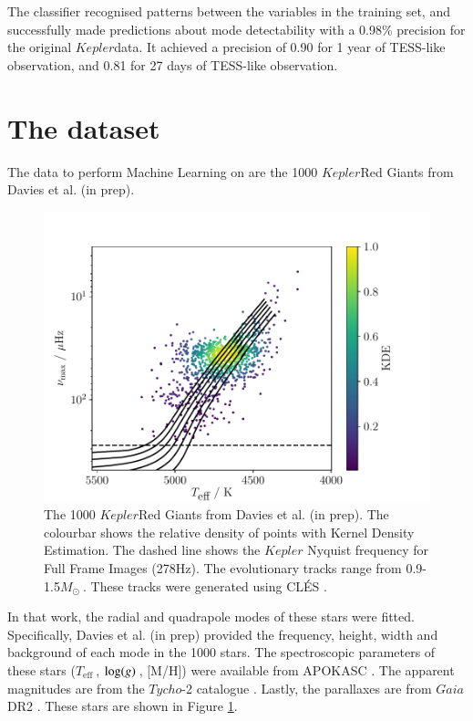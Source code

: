 \documentclass[a4paper,fleqn,usenatbib,useAMS]{mnras}
\newcommand{\teff}{\ensuremath{T_{\textrm{eff}}\:}}
\newcommand{\kep}{\ensuremath{Kepler}\:}
\newcommand{\msol}{\ensuremath{M_{\odot}\:}}
\newcommand{\logg}{\ensuremath{{\rm log}(g)\:}}
\begin{document}
The classifier recognised patterns between the variables in the training set, and successfully made predictions about mode detectability with a 0.98\% precision for the original \kep data. It achieved a precision of 0.90 for 1 year of TESS-like observation, and 0.81 for 27 days of TESS-like observation.
\fi


\section{The dataset}
\label{sect: dataset}

The data to perform Machine Learning on are the 1000 \kep Red Giants from Davies et al. (in prep).
\begin{figure}
	\centering
	\includegraphics[scale=0.5]{Plot1_HR.pdf}
	\caption{The 1000 \kep Red Giants from Davies et al. (in prep). The colourbar shows the relative density of points with Kernel Density Estimation. The dashed line shows the $Kepler$ Nyquist frequency for Full Frame Images (278Hz). The evolutionary tracks range from 0.9-1.5\msol. These tracks were generated using CL\'ES \citep{scuflaire_cles_2008}.}	
	\label{fig:dataset}
\end{figure}
In that work, the radial and quadrapole modes of these stars were fitted. Specifically, Davies et al. (in prep) provided the frequency, height, width and background of each mode in the 1000 stars. The spectroscopic parameters of these stars (\teff, \logg, [M/H]) were available from APOKASC \citet{pinsonneault_apokasc_2014}. The apparent magnitudes are from the $Tycho$-2 catalogue \citet{hog_tycho-2_2000}. Lastly, the parallaxes are from $Gaia$ DR2 \citet{lindegren_gaia_2018}. These stars are shown in Figure \ref{fig:dataset}.
\end{document}

